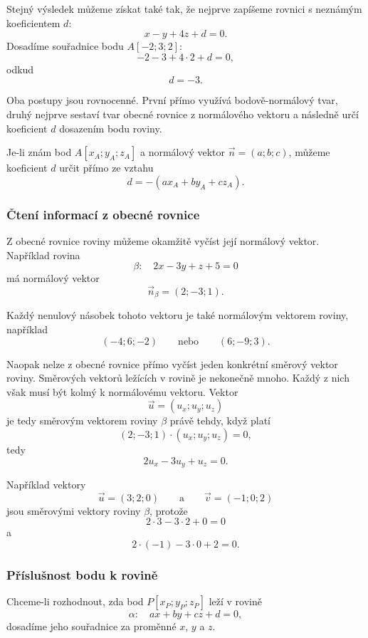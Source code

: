 Stejný výsledek můžeme získat také tak, že nejprve zapíšeme rovnici
s neznámým koeficientem $d$:
\[
    x-y+4z+d=0.
\]
Dosadíme souřadnice bodu $A[-2;3;2]$:
\[
    -2-3+4\cdot2+d=0,
\]
odkud
\[
    d=-3.
\]

Oba postupy jsou rovnocenné. První přímo využívá bodově-normálový tvar,
druhý nejprve sestaví tvar obecné rovnice z normálového vektoru a následně
určí koeficient $d$ dosazením bodu roviny.

\begin{remark}
    Je-li znám bod $A[x_A;y_A;z_A]$ a normálový vektor
    $\vec{n}=(a;b;c)$, můžeme koeficient $d$ určit přímo ze vztahu
    \[
        d=-(ax_A+by_A+cz_A).
    \]
\end{remark}

\subsubsection{Čtení informací z obecné rovnice}
\label{subsubsec:Reading_general_plane_equation}

Z obecné rovnice roviny můžeme okamžitě vyčíst její normálový vektor.
Například rovina
\[
    \beta:\quad 2x-3y+z+5=0
\]
má normálový vektor
\[
    \vec{n}_{\beta}=(2;-3;1).
\]

Každý nenulový násobek tohoto vektoru je také normálovým vektorem roviny,
například
\[
    (-4;6;-2)
    \qquad\text{nebo}\qquad
    (6;-9;3).
\]

Naopak nelze z obecné rovnice přímo vyčíst jeden konkrétní směrový vektor
roviny. Směrových vektorů ležících v rovině je nekonečně mnoho. Každý
z nich však musí být kolmý k normálovému vektoru. Vektor
\[
    \vec{u}=(u_x;u_y;u_z)
\]
je tedy směrovým vektorem roviny $\beta$ právě tehdy, když platí
\[
    (2;-3;1)\cdot(u_x;u_y;u_z)=0,
\]
tedy
\[
    2u_x-3u_y+u_z=0.
\]

Například vektory
\[
    \vec{u}=(3;2;0)
    \qquad\text{a}\qquad
    \vec{v}=(-1;0;2)
\]
jsou směrovými vektory roviny $\beta$, protože
\[
    2\cdot3-3\cdot2+0=0
\]
a
\[
    2\cdot(-1)-3\cdot0+2=0.
\]

\subsubsection{Příslušnost bodu k rovině}
\label{subsubsec:Point_membership_general_plane}

Chceme-li rozhodnout, zda bod $P[x_P;y_P;z_P]$ leží v rovině
\[
    \alpha:\quad ax+by+cz+d=0,
\]
dosadíme jeho souřadnice za proměnné $x$, $y$ a $z$.

